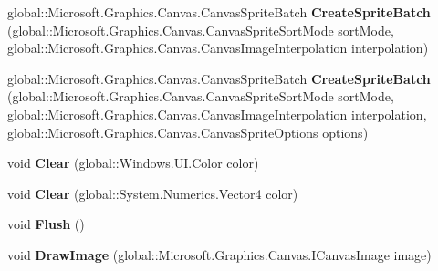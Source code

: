 \begin{DoxyCompactItemize}
global\+::\+Microsoft.\+Graphics.\+Canvas.\+Canvas\+Sprite\+Batch {\bfseries Create\+Sprite\+Batch} (global\+::\+Microsoft.\+Graphics.\+Canvas.\+Canvas\+Sprite\+Sort\+Mode sort\+Mode, global\+::\+Microsoft.\+Graphics.\+Canvas.\+Canvas\+Image\+Interpolation interpolation)
\item 
\mbox{\label{interface_microsoft_1_1_graphics_1_1_canvas_1_1_i_canvas_drawing_session_a3e72f710435d7fa104ce637a9f255634}} 
global\+::\+Microsoft.\+Graphics.\+Canvas.\+Canvas\+Sprite\+Batch {\bfseries Create\+Sprite\+Batch} (global\+::\+Microsoft.\+Graphics.\+Canvas.\+Canvas\+Sprite\+Sort\+Mode sort\+Mode, global\+::\+Microsoft.\+Graphics.\+Canvas.\+Canvas\+Image\+Interpolation interpolation, global\+::\+Microsoft.\+Graphics.\+Canvas.\+Canvas\+Sprite\+Options options)
\item 
\mbox{\label{interface_microsoft_1_1_graphics_1_1_canvas_1_1_i_canvas_drawing_session_a0f2129c914d633adc0d37c1f19dbbbff}} 
void {\bfseries Clear} (global\+::\+Windows.\+U\+I.\+Color color)
\item 
\mbox{\label{interface_microsoft_1_1_graphics_1_1_canvas_1_1_i_canvas_drawing_session_aca64e0841e7be8e14ef4bb099cb7a66a}} 
void {\bfseries Clear} (global\+::\+System.\+Numerics.\+Vector4 color)
\item 
\mbox{\label{interface_microsoft_1_1_graphics_1_1_canvas_1_1_i_canvas_drawing_session_a8ff1e3b4f084927a7d1387bb52efc41a}} 
void {\bfseries Flush} ()
\item 
\mbox{\label{interface_microsoft_1_1_graphics_1_1_canvas_1_1_i_canvas_drawing_session_ac1f4a3bd5849df08e07c05756ad7137a}} 
void {\bfseries Draw\+Image} (global\+::\+Microsoft.\+Graphics.\+Canvas.\+I\+Canvas\+Image image)
\item 
\mbox{\label{interface_microsoft_1_1_graphics_1_1_canvas_1_1_i_canvas_drawing_session_a7b45233377b9145c9ca991b8c65eb2a3}} 

\end{DoxyCompactItemize}
